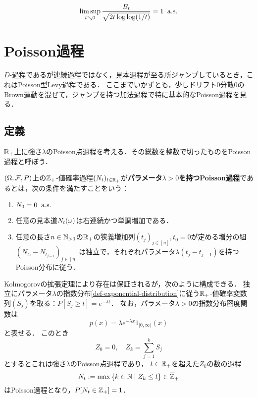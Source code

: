 \documentclass[uplatex,dvipdfmx]{jsreport}
\begin{document}
\begin{theorem}[重複対数の法則]
    \[\limsup_{t\searrow0}\frac{B_t}{\sqrt{2t\log\log(1/t)}}=1\;\;\mathrm{a.s.}\]
\end{theorem}

\section{Poisson過程}

\begin{tcolorbox}[colframe=ForestGreen, colback=ForestGreen!10!white,breakable,colbacktitle=ForestGreen!40!white,coltitle=black,fonttitle=\bfseries\sffamily,
title=]
    $D$-過程であるが連続過程ではなく，見本過程が至る所ジャンプしているとき，これはPoisson型Levy過程である．
    ここまでいかずとも，少しドリフト$0$分散$0$のBrown運動を混ぜて，ジャンプを持つ加法過程で特に基本的なPoisson過程を見る．
\end{tcolorbox}

\subsection{定義}

\begin{tcolorbox}[colframe=ForestGreen, colback=ForestGreen!10!white,breakable,colbacktitle=ForestGreen!40!white,coltitle=black,fonttitle=\bfseries\sffamily,
title=]
    $\mathbb{R}_+$上に強さ$\lambda$のPoisson点過程を考える．その総数を整数で切ったものをPoisson過程と呼ぼう．
\end{tcolorbox}

\begin{definition}
    $(\Omega,\mathcal{F},P)$上の$\mathbb{Z}_+$-値確率過程$(N_t)_{t\in\mathbb{R}_+}$が\textbf{パラメータ$\lambda>0$を持つPoisson過程}であるとは，次の条件を満たすことをいう：
    \begin{enumerate}
        \item $N_0=0\;\;\mathrm{a.s.}$
        \item 任意の見本道$N_t(\omega)$は右連続かつ単調増加である．
        \item 任意の長さ$n\in\mathbb{N}_{>0}$の$\mathbb{R}_+$の狭義増加列$(t_j)_{j\in[n]},t_0=0$が定める増分の組$(N_{t_j}-N_{t_{j-1}})_{j\in[n]}$は独立で，それぞれパラメータ$\lambda(t_j-t_{j-1})$を持つPoisson分布に従う．
    \end{enumerate}
\end{definition}

\begin{discussion}[Poisson過程の構成]
    Kolmogorovの拡張定理により存在は保証されるが，次のように構成できる．
    独立にパラメータ$\lambda$の指数分布\ref{def-exponential-distribution}に従う$\mathbb{R}_+$-値確率変数列$(S_j)$を取る：$P[S_j\ge t]=e^{-\lambda t}$．
    なお，パラメータ$\lambda>0$の指数分布密度関数は
    \[p(x)=\lambda e^{-\lambda x}1_{[0,\infty)}(x)\]
    と表せる．
    このとき
    \[Z_0=0,\quad Z_k=\sum^k_{j=1}S_j\]
    とするとこれは強さ$\lambda$のPoisson点過程であり，
    $t\in\mathbb{R}_+$を超えた$Z_k$の数の過程
    \[N_t:=\max\left\{k\in\mathbb{N}\mid Z_k\le t\right\}\in\overline{\mathbb{Z}}_+\]
    はPoisson過程となり，$P[N_t\in\mathbb{Z}_+]=1$．
\end{discussion}
\end{document}
